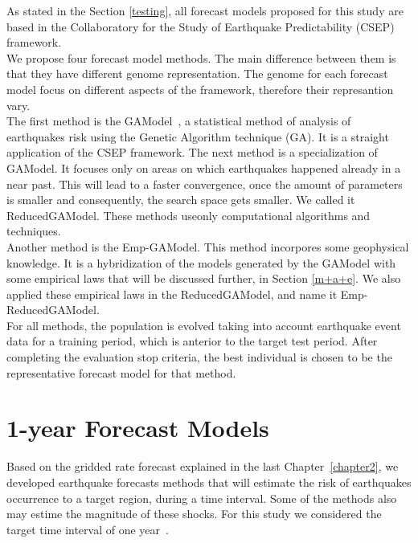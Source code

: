As stated in the Section \ref{testing}, all forecast models proposed for this study are based in the Collaboratory for the Study of Earthquake Predictability (CSEP) framework.\\

We propose four forecast model methods. The main difference between them is that they have different genome representation. The genome for each forecast model focus on different aspects of the framework, therefore their represantion vary.\\

The first method is the GAModel~\cite{ecta14}, a statistical method of analysis of
earthquakes risk using the Genetic Algorithm technique (GA). It is a straight application of the CSEP framework. The next method is a specialization of GAModel. It focuses only on areas on which earthquakes happened already in a near past. This will lead to a faster convergence, once the amount of parameters is smaller and consequently, the search space gets smaller. We called it ReducedGAModel. These methods useonly computational algorithms and techniques.\\

Another method is the Emp-GAModel. This method incorpores some
geophysical knowledge. It is a hybridization of the models generated by the GAModel with some empirical laws that will be discussed further, in Section \ref{m+a+e}. We also applied these empirical laws in the ReducedGAModel, and name it Emp-ReducedGAModel.\\

For all methods, the population is evolved taking into account earthquake event data for a training period, which is anterior to the target test period. After completing the evaluation stop criteria, the best individual is chosen to be the representative forecast model for that method.\\

\section{1-year Forecast Models}\label{1year-model}
Based on the gridded rate forecast explained in the last Chapter~\ref{chapter2}, we developed earthquake forecasts methods that will estimate the risk of earthquakes occurrence to a target region, during a time interval. Some of the methods also may estime the magnitude of these shocks. For this study we considered the target time interval of one year~\cite{ecta14}.\\

